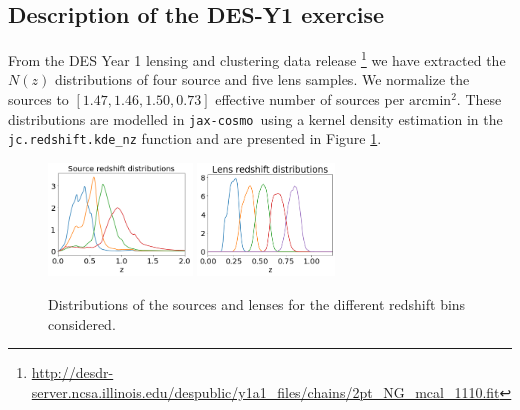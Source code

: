 \documentclass[twocolumn,twocolappendix,nofootinbib,iop]{openjournal}
\newcommand{\jaxcosmo}{\texttt{jax-cosmo}}
\begin{document}
\subsection{Description of the DES-Y1 exercise}
\label{sec-DESY1}
From the DES Year 1 lensing and clustering data release \footnote{\url{http://desdr-server.ncsa.illinois.edu/despublic/y1a1_files/chains/2pt_NG_mcal_1110.fit}} we have extracted the $N(z)$ distributions of four source and five lens samples. We normalize the sources to $[1.47, 1.46, 1.50, 0.73]$ effective number of sources per $\mathrm{arcmin}^2$. These distributions are modelled in \jaxcosmo\ using a kernel density estimation in the \texttt{jc.redshift.kde\_nz} function and are presented in Figure \ref{fig-DESY1-src-lens-redshift}.
\begin{figure}
\centering
\includegraphics[height=3cm]{figures/DESY1-source-redshift.png}
\includegraphics[height=3cm]{figures/DESY1-lens-redshift.png}
\caption{Distributions of the sources and lenses for the different redshift bins considered.}
\label{fig-DESY1-src-lens-redshift}
\end{figure}
\end{document}
